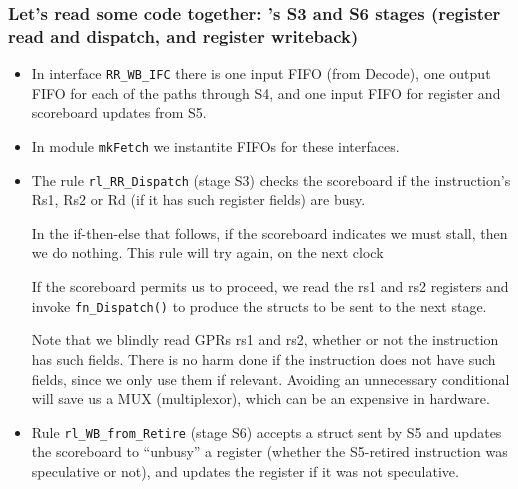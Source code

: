 \begin{frame}[fragile]
\frametitle{Let's read some code together: {\FIFE}'s S3 and S6 stages (register read and dispatch, and register writeback)}

\begin{center}\scriptsize

 \vspace*{5ex}
 
 \begin{minipage}{0.9\textwidth}
  \begin{itemize}

   \item In interface {\tt RR\_WB\_IFC} there is one input FIFO (from
     Decode), one output FIFO for each of the paths through S4, and
     one input FIFO for register and scoreboard updates from S5.

   \item In module {\tt mkFetch} we instantite FIFOs for these interfaces.

   \item The rule {\tt rl\_RR\_Dispatch} (stage S3) checks the
     scoreboard if the instruction's Rs1, Rs2 or Rd (if it has such
     register fields) are busy.

     In the if-then-else that follows, if the scoreboard indicates we
     must stall, then we do nothing.  This rule will try again, on the
     next clock

     If the scoreboard permits us to proceed, we read the rs1 and rs2
     registers and invoke {\tt fn\_Dispatch()} to produce the structs
     to be sent to the next stage.

     Note that we blindly read GPRs rs1 and rs2, whether or not the
     instruction has such fields.  There is no harm done if the
     instruction does not have such fields, since we only use them if
     relevant.  Avoiding an unnecessary conditional will save us a MUX
     (multiplexor), which can be an expensive in hardware.

   \item Rule {\tt rl\_WB\_from\_Retire} (stage S6) accepts a struct
     sent by S5 and updates the scoreboard to ``unbusy'' a register
     (whether the S5-retired instruction was speculative or not), and
     updates the register if it was not speculative.

  \end{itemize}
 \end{minipage}
\end{center}

\end{frame}

